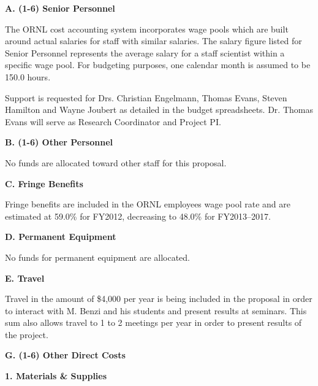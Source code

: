 \begin{description}

\item {\bf A. (1-6) Senior Personnel}
  
  The ORNL cost accounting system incorporates wage pools which are built
  around actual salaries for staff with similar salaries.  The salary figure
  listed for Senior Personnel represents the average salary for a staff
  scientist within a specific wage pool.  For budgeting purposes, one calendar
  month is assumed to be 150.0 hours.
  
  Support is requested for Drs. Christian Engelmann, Thomas Evans, Steven
  Hamilton and Wayne Joubert as detailed in the budget spreadsheets.
  Dr. Thomas Evans will serve as Research Coordinator and Project PI.

\item {\bf B. (1-6) Other Personnel}
  
  No funds are allocated toward other staff for this proposal.

\item {\bf C. Fringe Benefits}

  Fringe benefits are included in the ORNL employees wage pool rate and are
  estimated at 59.0\% for FY2012, decreasing to 48.0\% for FY2013--2017.

\item {\bf D. Permanent Equipment}
  
  No funds for permanent equipment are allocated.
 
\item {\bf E. Travel}
  
  Travel in the amount of \$4,000 per year is being included in the proposal
  in order to interact with M. Benzi and his students and present results at
  seminars.  This sum also allows travel to 1 to 2 meetings per year in order
  to present results of the project.

\item {\bf G. (1-6) Other Direct Costs}
  
  \begin{description}
    
  \item {\bf 1. Materials \& Supplies}
    

\end{description}
\end{description}
